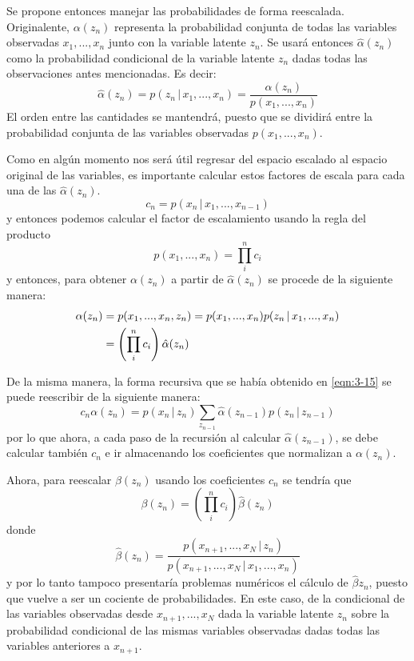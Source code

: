 Se propone entonces manejar las probabilidades de forma reescalada. Originalente, $\alpha(z_n)$ representa la probabilidad conjunta de todas las variables observadas $x_1, ..., x_n$ junto con la variable latente $z_n$. Se usará entonces $\hat \alpha(z_n)$ como la probabilidad condicional de la variable latente $z_n$ dadas todas las observaciones antes mencionadas. Es decir:
\begin{equation}
  \hat \alpha(z_n) = p(z_n \,|\, x_1, ..., x_n )
    = \frac{\alpha(z_n)}{p(x_1, ..., x_n)}
  \label{eqn:3-21}
\end{equation}
El orden entre las cantidades se mantendrá, puesto que se dividirá entre la probabilidad conjunta de las variables observadas $p(x_1, ..., x_n)$.

Como en algún momento nos será útil regresar del espacio escalado al espacio original de las variables, es importante calcular estos factores de escala para cada una de las $\hat \alpha(z_n)$.
\begin{equation}
  c_n = p(x_n \,|\, x_1, ..., x_{n-1})
  \label{eqn:3-22}
\end{equation}
y entonces podemos calcular el factor de escalamiento usando la regla del producto
\begin{equation}
  p(x_1, ..., x_n) = \prod_i^n c_i 
  \label{eqn:3-23}
\end{equation}
y entonces, para obtener $\alpha(z_n)$ a partir de $\hat \alpha(z_n)$ se procede de la siguiente manera:
\begin{align}
  \alpha(z_n) &= p(x_1, ..., x_n, z_n) 
    = p(x_1, ..., x_n) p(z_n \,|\, x_1, ..., x_n ) \notag \\
    &= \left( \prod_i^n c_i \right) \hat \alpha(z_n)    
  \label{eqn:3-24}
\end{align}

De la misma manera, la forma recursiva que se había obtenido en \eqref{eqn:3-15} se puede reescribir de la siguiente manera:
\begin{equation}
  c_n \alpha(z_n) = p(x_n \,|\, z_n) \sum_{z_{n-1}} 
    \hat \alpha(z_{n-1}) p(z_n \,|\, z_{n-1})
    \label{eqn:3-25}
\end{equation}
por lo que ahora, a cada paso de la recursión al calcular $\hat \alpha(z_{n-1})$, se debe calcular también $c_n$ e ir almacenando los coeficientes que normalizan a $\alpha(z_n)$.

Ahora, para reescalar $\beta(z_n)$ usando los coeficientes $c_n$ se tendría que
\begin{equation}
  \beta(z_n) = \left( \prod_i^n c_i \right) \hat \beta(z_n)
  \label{eqn:3-26}
\end{equation}
donde 
\begin{equation}
  \hat \beta(z_n) = 
    \frac{p(x_{n+1}, ..., x_N \,|\, z_n)}
    {p(x_{n+1}, ..., x_N \,|\, x_1, ..., x_n)}
  \label{eqn:3-27}
\end{equation}
y por lo tanto tampoco presentaría problemas numéricos el cálculo de $\hat \beta{z_n}$, puesto que vuelve a ser un cociente de probabilidades. En este caso, de la condicional de las variables observadas desde $x_{n+1}, ..., x_N$ dada la variable latente $z_n$ sobre la probabilidad condicional de las mismas variables observadas dadas todas las variables anteriores a $x_{n+1}$.

